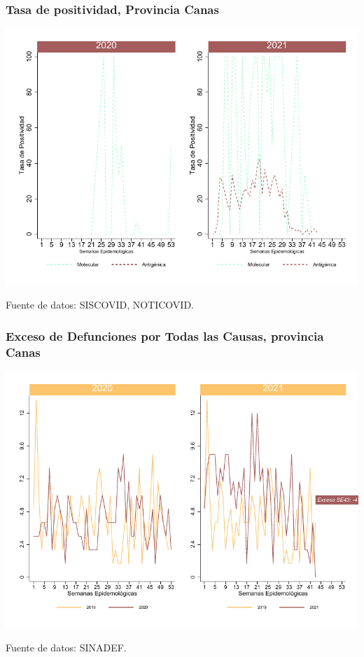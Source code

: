 \documentclass[xcolor=table]{beamer}
\begin{document}
\begin{frame}
	\frametitle{Tasa de positividad, Provincia Canas}
	\vspace{-.5cm}
	\begin{center}
		\includegraphics[width=0.8\linewidth, trim={0cm .5cm 0cm 0.2cm},clip]{../figuras/positividad_20_21_4.pdf}
	\end{center}
	{\tiny Fuente de datos: SISCOVID, NOTICOVID.}
\end{frame}

\begin{frame}
	\frametitle{Exceso de Defunciones por Todas las Causas, provincia Canas}
	\vspace{-.5cm}
	\begin{center}
		\includegraphics[width=0.8\linewidth, trim={0cm .5cm 0cm 0.2cm},clip]{../figuras/exceso_4.pdf}
	\end{center}
	{\tiny Fuente de datos: SINADEF.}
	
	\hyperlink{indicadores_provinciales}{}
\end{frame}
\end{document}

